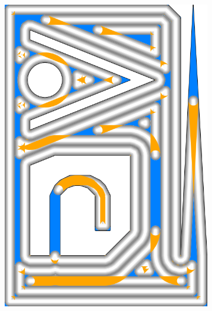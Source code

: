 \begin{figure}
\centering
\setlength{\figwidth}{0.19\textwidth}
\setlength{\figheight}{0.283\textwidth}
\begin{subfigure}{\figwidth}\centering
\includegraphics[height=\figheight]{sources-validation-gMAT-example-TEST-naive-accuracy.png}

\end{subfigure}
\end{figure}
